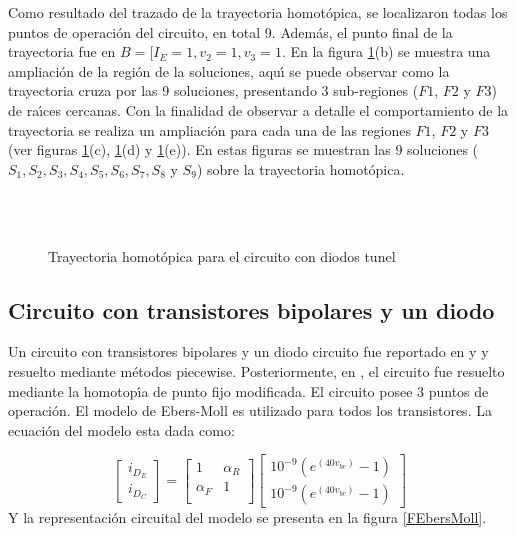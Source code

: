\documentclass[conference,letterpaper,onecolumn]{IEEEtran}
\begin{document}
{Como resultado del trazado de la trayectoria homot\'opica,
se localizaron todas los puntos de operaci\'on  del circuito, en total  9. 
Adem\'as, el punto final de la trayectoria fue en $B=[I_E=1,v_2=1,v_3=1$.
En la figura \ref{2tunelg}(b) se muestra una ampliaci\'on de la regi\'on de la soluciones,
aqu\'{\i} se puede observar como la trayectoria cruza por las 9 soluciones, presentando 3 sub-regiones  ($F1$, $F2$ y $F3$)
de ra\'{\i}ces cercanas.
Con la finalidad de observar a detalle el comportamiento de la trayectoria
se realiza un ampliaci\'on para cada una de las regiones $F1$, $F2$ y $F3$ (ver
figuras \ref{2tunelg}(c), \ref{2tunelg}(d) y \ref{2tunelg}(e)).
En estas figuras se muestran las 9 soluciones ($S_1, S_2, S_3, S_4, S_5, S_6, S_7, S_8$ y $S_9$) sobre la trayectoria
homot\'opica. 

 
\begin{figure}[hbtp]
\centerline{
\epsfxsize=30mm
\newline \\
\epsfxsize=30mm
\epsfxsize=30mm
\newline \\
\epsfxsize=30mm
\epsfxsize=30mm
}
\caption{Trayectoria homot\'opica para el circuito con diodos tunel}
\label{2tunelg}
\end{figure}



\subsection{Circuito con transistores bipolares y un diodo}

Un circuito con transistores bipolares y un diodo circuito fue reportado en \cite{homo_tadeusiewicz} y  \cite{homo_yamamurawise}  y resuelto
mediante m\'etodos piecewise.
Posteriormente, en \cite{homo_yamamura}, el circuito fue resuelto mediante la homotop\'{\i}a de punto fijo modificada.
El circuito posee 3 puntos de operaci\'on. El modelo de Ebers-Moll es utilizado para todos los transistores.
La ecuaci\'on del modelo
esta dada como:

\begin{displaymath}
\left[ \begin{array}{c}
i_{D_E} \\
i_{D_C}
\end{array}\right] =
\left[ \begin{array}{cc} 1  & \alpha_R \\
\alpha_F & 1 \\
\end{array}\right] \left[ \begin{array}{c}
10^{-9}(e^{(40v_{be})} - 1) \\
10^{-9}(e^{(40v_{bc})} - 1)
\end{array}\right]
\end{displaymath}
Y la representaci\'on circuital del modelo se presenta en la figura \ref{FEbersMoll}.

}
\end{document}
